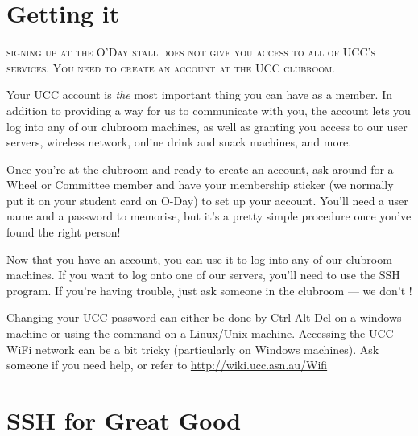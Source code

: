 \label{SetupAccount}


\section{Getting it}

\begin{mdframed}

\textsc{signing up at the O'Day stall does not give you access to all of UCC's services. You need to create an account at the UCC clubroom.}

Your UCC account is \emph{the} most important thing you can have as a member. In addition to providing a way for us to communicate with you, the account lets you log into any of our clubroom machines, as well as granting you access to our user servers, wireless network, online drink and snack machines, and more.

Once you're at the clubroom and ready to create an account, ask around for a Wheel or Committee member and have your membership sticker (we normally put it on your student card on O-Day) to set up your account. You'll need a user name and a password to memorise, but it's a pretty simple procedure once you've found the right person!


Now that you have an account, you can use it to log into any of our clubroom machines. If you want to log onto one of our servers, you'll need to use the SSH program. If you're having trouble, just ask someone in the clubroom --- we don't !

Changing your UCC password can either be done by Ctrl-Alt-Del on a windows machine or using the command  on a Linux/Unix machine.
Accessing the UCC WiFi network can be a bit tricky (particularly on Windows machines). Ask someone if you need help, or refer to \url{http://wiki.ucc.asn.au/Wifi}

\end{mdframed}

\section{SSH for Great Good}

